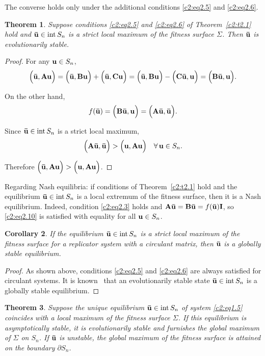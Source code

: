 \documentclass[12pt]{report}
\newcommand{\inside}{\mathrm{int}\,}
\newcommand{\bound}{\partial}
\newtheorem{theorem}{Theorem}[section]
\newtheorem{conseq}[theorem]{Corollary}
\theoremstyle{definition}
\theoremstyle{remark}
\begin{document}
The converse holds only under the additional conditions \eqref{c2:eq2.5} and \eqref{c2:eq2.6}.
\begin{theorem}\label{c2:t2.4}
	Suppose conditions \eqref{c2:eq2.5} and \eqref{c2:eq2.6} of Theorem~\ref{c2:t2.1} hold and ${\bf \bar{u}} \in \inside S_{n}$ is a strict local maximum of the fitness surface $\Sigma$. Then ${\bf \bar{u}}$ is evolutionarily stable.
\end{theorem}

\begin{proof}
	For any ${\bf u} \in S_{n}$,
	$$
	\Big({\bf \bar{u}, Au}\Big) = \Big({\bf \bar{u}, Bu}\Big) + \Big({\bf \bar{u}, Cu}\Big) = \Big({\bf \bar{u}, Bu}\Big) - \Big({\bf C\bar{u}, u}\Big) = \Big({\bf B\bar{u}, u}\Big).
	$$
	
	On the other hand,
	$$
	f({\bf \bar{u}}) = \Big({\bf B\bar{u}, u}\Big) = \Big({\bf A\bar{u}, \bar{u}}\Big).
	$$
	
	Since ${\bf \bar{u}} \in \inside S_{n}$ is a strict local maximum,
	$$
	\Big({\bf A\bar{u}, \bar{u}}\Big) > \Big({\bf u, Au}\Big) \quad \forall\, {\bf u} \in S_{n}.
	$$
	
	Therefore $\Big({\bf \bar{u}, Au}\Big) > \Big({\bf u, Au}\Big)$. 
\end{proof}

Regarding Nash equilibria: if conditions of Theorem~\ref{c2:t2.1} hold and the equilibrium ${\bf \bar{u}} \in \inside S_{n}$ is a local extremum of the fitness surface, then it is a Nash equilibrium. Indeed, condition \eqref{c2:eq2.3} holds and ${\bf A\bar{u} = B\bar{u}} = f({\bf \bar{u}}){\bf I}$, so \eqref{c2:eq2.10} is satisfied with equality for all ${\bf u} \in S_{n}$.

\begin{conseq}\label{c2:con2.1}
	If the equilibrium ${\bf \bar{u}} \in \inside S_{n}$ is a strict local maximum of the fitness surface for a replicator system with a circulant matrix, then ${\bf \bar{u}}$ is a globally stable equilibrium.
\end{conseq}

\begin{proof}
	As shown above, conditions \eqref{c2:eq2.5} and \eqref{c2:eq2.6} are always satisfied for circulant systems. It is known~\cite{c2:Hofbauer2003} that an evolutionarily stable state ${\bf \bar{u}} \in \inside S_{n}$ is a globally stable equilibrium. 
\end{proof}

\begin{theorem}\label{c2:t2.5}
	Suppose the unique equilibrium ${\bf \bar{u}} \in \inside S_{n}$ of system \eqref{c2:eq1.5} coincides with a local maximum of the fitness surface $\Sigma$. If this equilibrium is asymptotically stable, it is evolutionarily stable and furnishes the global maximum of $\Sigma$ on $S_{n}$. If ${\bf \bar{u}}$ is unstable, the global maximum of the fitness surface is attained on the boundary $\bound S_{n}$.
\end{theorem}
\end{document}
